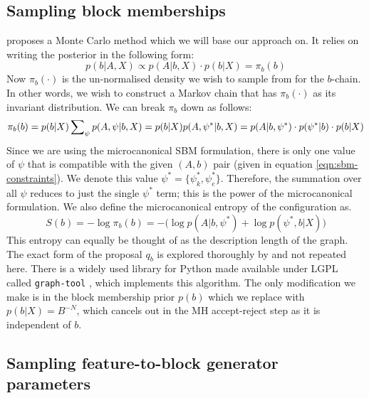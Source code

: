 \FloatBarrier

\subsection{Sampling block memberships}

\citet{Peixoto-MCMC} proposes a Monte Carlo method which we will base our approach on. It relies on writing the posterior in the following form:
%
\begin{equation}
	p(b | A, X) \propto p(A | b, X) \cdot p(b | X) = \pi_b(b)
\end{equation}
%
Now $\pi_b(\cdot)$ is the un-normalised density we wish to sample from for the $b$-chain. In other words, we wish to construct a Markov chain that has $\pi_b(\cdot)$ as its invariant distribution. We can break $\pi_b$ down as follows:
%
\begin{equation}
	\pi_b(b) = p(b|X) \sum_{\psi} \nolimits p(A , \psi | b, X) \\
	= p(b|X) p(A, \psi^* | b, X) \\
	= p(A | b, \psi^*) \cdot p(\psi^* | b) \cdot p(b | X)
\end{equation}
%
Since we are using the microcanonical SBM formulation, there is only one value of $\psi$ that is compatible with the given $(A, b)$ pair (given in equation \ref{eqn:sbm-constraints}). We denote this value $\psi^* = \{\psi_k^*, \psi_e^*\}$. Therefore, the summation over all $\psi$ reduces to just the single $\psi^*$ term; this is the power of the microcanonical formulation. We also define the microcanonical entropy of the configuration as.
%
\begin{equation}
	S(b) = - \log \pi_b(b) = - \Big( \log p(A | b, \psi^*) + \log p(\psi^*, b | X) \Big)
	\label{eqn:dl-form}
\end{equation}
%
This entropy can equally be thought of as the description length of the graph. The exact form of the proposal $q_b$ is explored thoroughly by \citet{Peixoto-MCMC} and not repeated here. There is a widely used library for Python made available under LGPL called \verb*|graph-tool| \cite{peixoto_graph-tool_2014}, which implements this algorithm. The only modification we make is in the block membership prior $p(b)$ which we replace with $p(b|X)=B^{-N}$, which cancels out in the MH accept-reject step as it is independent of $b$.

\subsection{Sampling feature-to-block generator parameters}


